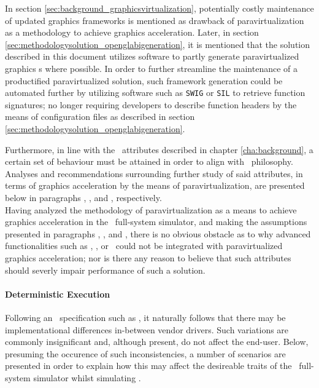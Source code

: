 In section \ref{sec:background_graphicsvirtualization}, potentially costly maintenance of updated graphics frameworks is mentioned as drawback of paravirtualization as a methodology to achieve graphics acceleration.
Later, in section \ref{sec:methodologysolution_openglabigeneration}, it is mentioned that the solution described in this document utilizes software to partly generate paravirtualized graphics \dvttermabi s where possible.
In order to further streamline the maintenance of a productified paravirtualized solution, such framework generation could be automated further by utilizing software such as \texttt{SWIG} or \texttt{SIL} to retrieve function signatures; no longer requiring developers to describe function headers by the means of configuration files as described in section \ref{sec:methodologysolution_openglabigeneration}.

Furthermore, in line with the \dvttermsimics\ attributes described in chapter \ref{cha:background}, a certain set of behaviour must be attained in order to align with \dvttermsimics\ philosophy.
Analyses and recommendations surrounding further study of said attributes, in terms of graphics acceleration by the means of paravirtualization, are presented below in paragraphs , , and , respectively.\\

\noindent
Having analyzed the methodology of paravirtualization as a means to achieve graphics acceleration in the \dvttermsimics\ full-system simulator, and making the assumptions presented in paragraphs , , and , there is no obvious obstacle as to why advanced functionalities such as \dvttermdeterministicexecution , \dvttermcheckpointing , or \dvttermreverseexecution\ could not be integrated with paravirtualized graphics acceleration; nor is there any reason to believe that such attributes should severly impair performance of such a solution.

\paragraph{Deterministic Execution}
\label{par:appendixa_simicsproductification_deterministicexecution}
Following an \dvttermapi\ specification such as \dvttermopengles , it naturally follows that there may be implementational differences in-between vendor drivers.
Such variations are commonly insignificant and, although present, do not affect the end-user.
Below, presuming the occurence of such inconsistencies, a number of scenarios are presented in order to explain how this may affect the desireable traits of the \dvttermsimics\ full-system simulator whilst simulating \dvttermopengles .

